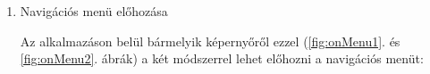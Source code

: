 \documentclass[../main.tex]{subfiles}
\begin{document}
            \begin{enumerate}
                \item Navigációs menü előhozása
                
                    Az alkalmazáson belül bármelyik képernyőről ezzel (\ref{fig:onMenu1}. és \ref{fig:onMenu2}. ábrák) a két módszerrel lehet előhozni a navigációs menüt:
                    \begin{figure}[!h]
                        \begin{floatrow}
                        \end{floatrow}
                    \end{figure}\\
                    

\end{enumerate}
\end{document}
